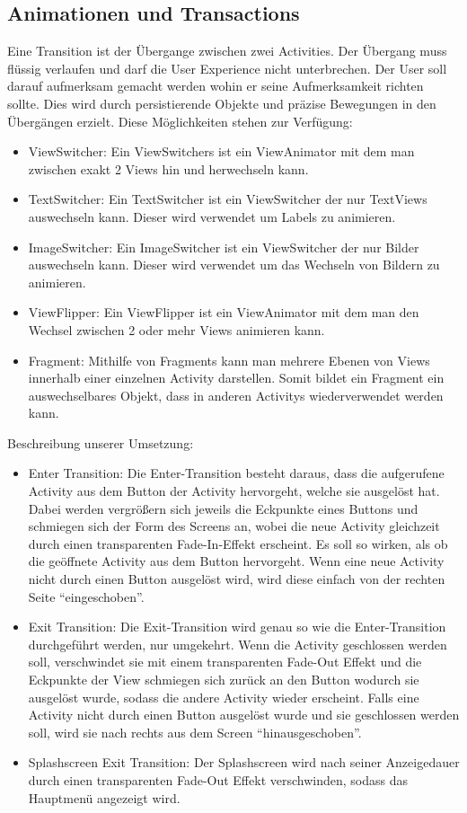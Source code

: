 \documentclass[FIPLY_base.tex]{subfiles}
\begin{document}
\subsection{Animationen und Transactions}
Eine Transition ist der Übergange zwischen zwei Activities.
Der Übergang muss flüssig verlaufen und darf die User Experience nicht unterbrechen. Der User soll darauf aufmerksam gemacht werden wohin er seine Aufmerksamkeit richten sollte. Dies wird durch persistierende Objekte und präzise Bewegungen in den Übergängen erzielt.
Diese Möglichkeiten stehen zur Verfügung:
\begin{itemize}
	\item ViewSwitcher: Ein ViewSwitchers ist ein ViewAnimator mit dem man zwischen exakt 2 Views hin und herwechseln kann. 
	\item TextSwitcher: Ein TextSwitcher ist ein ViewSwitcher der nur TextViews auswechseln kann. Dieser wird verwendet um Labels zu animieren.
	\item ImageSwitcher: Ein ImageSwitcher ist ein ViewSwitcher der nur Bilder auswechseln kann. Dieser wird verwendet um das Wechseln von Bildern zu animieren.
	\item ViewFlipper: Ein ViewFlipper ist ein ViewAnimator mit dem man den Wechsel zwischen 2 oder mehr Views animieren kann.
	\item Fragment: Mithilfe von Fragments kann man mehrere Ebenen von Views innerhalb einer einzelnen Activity darstellen. Somit bildet ein 
	Fragment ein auswechselbares Objekt, dass in anderen Activitys 
	wiederverwendet werden kann. 
\end{itemize}
Beschreibung unserer Umsetzung:
\begin{itemize}
	\item Enter Transition: Die Enter-Transition besteht daraus, dass die aufgerufene Activity aus dem Button der Activity hervorgeht, welche sie ausgelöst hat. Dabei werden vergrößern sich jeweils die Eckpunkte eines Buttons und schmiegen sich der Form des Screens an, wobei die neue Activity gleichzeit durch einen transparenten Fade-In-Effekt erscheint. Es soll so wirken, als ob die geöffnete Activity aus dem Button hervorgeht. Wenn eine neue Activity nicht durch einen Button ausgelöst wird, wird diese einfach von der rechten Seite “eingeschoben”.
	\item Exit Transition: Die Exit-Transition wird genau so wie die Enter-Transition    durchgeführt werden, nur umgekehrt. Wenn die Activity geschlossen werden soll, verschwindet sie mit einem transparenten Fade-Out Effekt und die Eckpunkte der View schmiegen sich zurück an den Button wodurch sie ausgelöst wurde, sodass die andere Activity wieder erscheint. Falls eine Activity nicht durch einen Button ausgelöst wurde und sie geschlossen werden soll, wird sie nach rechts aus dem Screen “hinausgeschoben”.
	\item Splashscreen Exit Transition: Der Splashscreen wird nach seiner Anzeigedauer durch einen transparenten Fade-Out Effekt verschwinden, sodass das Hauptmenü angezeigt wird.
\end{itemize}
\end{document}
